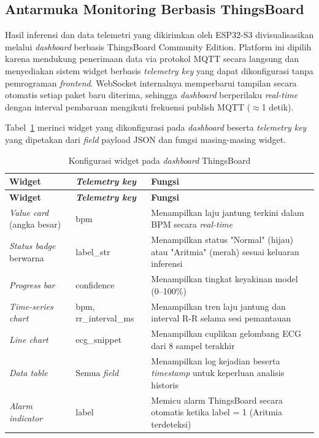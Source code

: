 \subsection{Antarmuka Monitoring Berbasis ThingsBoard}
\label{subsec:dashboard-thingsboard}

Hasil inferensi dan data telemetri yang dikirimkan oleh ESP32-S3
divisualisasikan melalui \textit{dashboard} berbasis ThingsBoard
Community Edition. Platform ini dipilih karena mendukung penerimaan
data via protokol MQTT secara langsung dan menyediakan sistem widget
berbasis \textit{telemetry key} yang dapat dikonfigurasi tanpa
pemrograman \textit{frontend}. WebSocket internalnya memperbarui tampilan
secara otomatis setiap paket baru diterima, sehingga \textit{dashboard}
berperilaku \textit{real-time} dengan interval pembaruan mengikuti
frekuensi publish MQTT ($\approx$1 detik).

Tabel~\ref{tab:widget-thingsboard} merinci widget yang dikonfigurasi
pada \textit{dashboard} beserta \textit{telemetry key} yang dipetakan
dari \textit{field} payload JSON dan fungsi masing-masing widget.

\begin{center}
  \setlength{\tabcolsep}{4pt}
  \renewcommand{\arraystretch}{1.15}
  \small
  \begin{longtable}{|p{4.0cm}|p{3.1cm}|p{6.0cm}|}
    \caption{Konfigurasi widget pada \textit{dashboard} ThingsBoard}
    \label{tab:widget-thingsboard} \\
    \hline
    \rowcolor{headgray}
    \textbf{Widget} &
    \textbf{\textit{Telemetry key}} &
    \textbf{Fungsi} \\
    \hline
    \endfirsthead
    \hline
    \rowcolor{headgray}
    \textbf{Widget} &
    \textbf{\textit{Telemetry key}} &
    \textbf{Fungsi} \\
    \hline
    \endhead
    \hline
    \endfoot
    \textit{Value card} (angka besar) &
    bpm &
    Menampilkan laju jantung terkini dalam BPM secara \textit{real-time}\\
    \hline
    \textit{Status badge} berwarna &
    label\_str &
    Menampilkan status "Normal" (hijau) atau
    "Aritmia" (merah) sesuai keluaran inferensi \\
    \hline
    \textit{Progress bar} &
    confidence &
    Menampilkan tingkat keyakinan model (0--100\%) \\
    \hline
    \textit{Time-series chart} &
    bpm, rr\_interval\_ms &
    Menampilkan tren laju jantung dan interval R-R selama sesi
    pemantauan \\
    \hline
    \textit{Line chart} &
    ecg\_snippet &
    Menampilkan cuplikan gelombang ECG dari 8 sampel terakhir \\
    \hline
    \textit{Data table} &
    Semua \textit{field} &
    Menampilkan log kejadian beserta \textit{timestamp} untuk
    keperluan analisis historis \\
    \hline
    \textit{Alarm indicator} &
    label &
    Memicu alarm ThingsBoard secara otomatis ketika
    label = 1 (Aritmia terdeteksi) \\
  \end{longtable}
\end{center}

